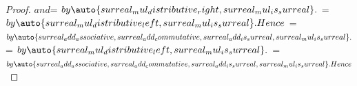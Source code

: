 \begin{proof}
        {}
        {}$ and
        $=\surrealAdd
        {}
        {}$
        by
        \auto{surreal_mul_distributive_right,surreal_mul_is_surreal}.
    $\surrealAdd
        {}
        {}
        =\surrealAdd
            {\surrealAdd
                {}
                {}}
            {\surrealAdd
                {}
                {}}$
        by
        \auto{surreal_mul_distributive_left,surreal_mul_is_surreal}.
    Hence
        $\surrealAdd
            {}
            {}
        =\surrealAdd
            {}
            {}$
        by
        \auto{surreal_add_associative,surreal_add_commutative,surreal_add_is_surreal,surreal_mul_is_surreal}.
    $\surrealAdd
        {}
        {}
        =\surrealAdd
            {\surrealAdd
                {}
                {}}
            {\surrealAdd
                {}
                {}}$
        by
        \auto{surreal_mul_distributive_left,surreal_mul_is_surreal}.
    $\surrealAdd
            {
                {}}
            {}
        =\surrealAdd
            {}
            {}$
        by
        \auto{surreal_add_associative,surreal_add_commutative,surreal_add_is_surreal,surreal_mul_is_surreal}.
    Hence
        $\surrealLt
            {\surrealAdd
                {}
                {}}
            {\surrealAdd
                {
}}
\end{proof}

